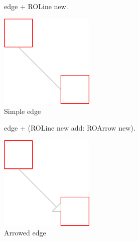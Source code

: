 \documentclass[a4paper,10pt,twoside]{book}
\begin{document}
\begin{figure}[H]
      \begin{minipage}[t]{0.5\textwidth}
      \vspace{0pt}
     \begin{code}{}
edge + ROLine new. \end{code}
   \end{minipage}
   \hfill
   \begin{minipage}[t]{0.4\textwidth}
      \vspace{0pt} \raggedright
       \centering
		\includegraphics[width=0.4\textwidth]{line}
   \end{minipage}
\caption{Simple edge}
\label{fig:line}
\end{figure} 

\begin{figure}[H]
      \begin{minipage}[t]{0.5\textwidth}
      \vspace{0pt}
     \begin{code}{}
edge + (ROLine new add: ROArrow new). \end{code}
   \end{minipage}
   \hfill
   \begin{minipage}[t]{0.4\textwidth}
      \vspace{0pt} \raggedright
       \centering
		\includegraphics[width=0.4\textwidth]{arrowEdge}
   \end{minipage}
\caption{Arrowed edge}
\label{fig:arrowEdge}
\end{figure} 
\end{document}
